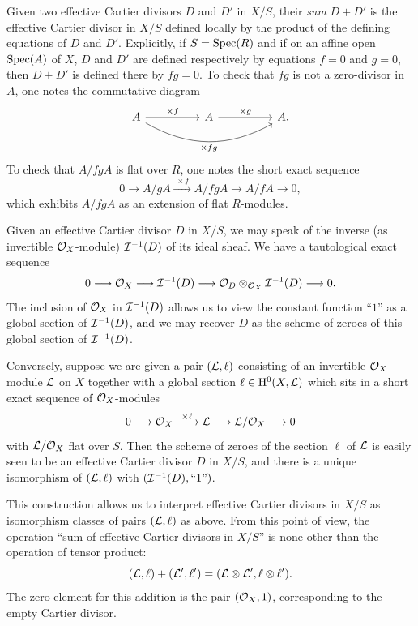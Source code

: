 \kmitem\label{item:1.1.2}
Given two effective Cartier divisors $D$ and $D'$ in $X/S$, their \emph{sum} $D + D'$ is the effective Cartier divisor in $X/S$ defined locally by the product of the defining equations of $D$ and $D'$. Explicitly, if $S = \operatorname{Spec}(R)$ and if on an affine open $\operatorname{Spec}(A)$ of $X$, $D$ and $D'$ are defined respectively by equations $f = 0$ and $g = 0$, then $D + D'$ is defined there by $fg = 0$. To check that $fg$ is not a zero-divisor in $A$, one notes the commutative diagram
\[
\begin{tikzcd}[column sep=huge]
A \arrow[r, "\times f"] \arrow[rr, bend right=30, "\times fg"'] & A \arrow[r, "\times g"] & A.
\end{tikzcd}
\]
To check that $A/fgA$ is flat over $R$, one notes the short exact sequence
\[
0 \longrightarrow A/gA \xrightarrow{\;\times f\;} A/fgA \longrightarrow A/fA \longrightarrow 0,
\]
which exhibits $A/fgA$ as an extension of flat $R$-modules.

\kmitem\label{item:1.1.3}
Given an effective Cartier divisor $D$ in $X/S$, we may speak of the inverse (as invertible $\mathcal{O}_X$-module) $\mathcal{I}^{-1}(D)$ of its ideal sheaf. We have a tautological exact sequence
\[
0 \longrightarrow \mathcal{O}_X \longrightarrow \mathcal{I}^{-1}(D) \longrightarrow \mathcal{O}_D \otimes_{\mathcal{O}_X} \mathcal{I}^{-1}(D) \longrightarrow 0.
\]
The inclusion of $\mathcal{O}_X$ in $\mathcal{I}^{-1}(D)$ allows us to view the constant function ``$1$'' as a global section of $\mathcal{I}^{-1}(D)$, and we may recover $D$ as the scheme of zeroes of this global section of $\mathcal{I}^{-1}(D)$.

Conversely, suppose we are given a pair $(\mathcal{L}, \ell)$ consisting of an invertible $\mathcal{O}_X$-module $\mathcal{L}$ on $X$ together with a global section $\ell \in \mathrm{H}^0(X, \mathcal{L})$ which sits in a short exact sequence of $\mathcal{O}_X$-modules
\[
0 \longrightarrow \mathcal{O}_X \xrightarrow{\;\times \ell\;} \mathcal{L} \longrightarrow \mathcal{L}/\mathcal{O}_X \longrightarrow 0
\]
with $\mathcal{L}/\mathcal{O}_X$ flat over $S$. Then the scheme of zeroes of the section $\ell$ of $\mathcal{L}$ is easily seen to be an effective Cartier divisor $D$ in $X/S$, and there is a unique isomorphism of $(\mathcal{L}, \ell)$ with $(\mathcal{I}^{-1}(D), \text{``}1\text{''})$.

This construction allows us to interpret effective Cartier divisors in $X/S$ as isomorphism classes of pairs $(\mathcal{L}, \ell)$ as above. From this point of view, the operation ``sum of effective Cartier divisors in $X/S$'' is none other than the operation of tensor product:
\[
(\mathcal{L}, \ell) + (\mathcal{L}', \ell') = (\mathcal{L} \otimes \mathcal{L}', \ell \otimes \ell').
\]
The zero element for this addition is the pair $(\mathcal{O}_X, 1)$, corresponding to the empty Cartier divisor.

